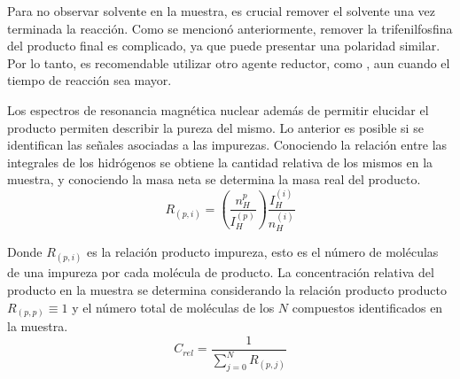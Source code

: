 \documentclass[fleqn,11pt]{SelfArx}
\begin{document}
Para no observar solvente en la muestra, es crucial remover el solvente una vez terminada la reacción. Como se mencionó anteriormente, remover la trifenilfosfina del producto final es complicado, ya que puede presentar una polaridad similar. Por lo tanto, es recomendable utilizar otro agente reductor, como , aun cuando el tiempo de reacción sea mayor.

Los espectros de resonancia magn\'etica nuclear adem\'as de permitir elucidar el producto permiten describir la pureza del mismo. Lo anterior es posible si se identifican las se\~nales asociadas a las impurezas. Conociendo la relaci\'on entre las integrales de los hidr\'ogenos se obtiene la cantidad relativa de los mismos en la muestra, y conociendo la masa neta se determina la masa real del producto.
\begin{equation}
R_{(p, i)} = \left(\dfrac{n_H^{p}}{I_H^{(p)}}\right)\dfrac{I^{(i)}_H}{n_H^{(i)}}
\end{equation}

Donde $R_{(p, i)}$ es la relaci\'on producto impureza, esto es el n\'umero de mol\'eculas de una impureza por cada mol\'ecula de producto. La concentraci\'on relativa del producto en la muestra se determina considerando la relaci\'on producto producto $R_{(p, p)} \equiv 1$ y el n\'umero total de mol\'eculas de los $N$ compuestos identificados en la muestra.
\begin{equation}\label{eq: concentracion}
C_{rel} = \dfrac{1}{\sum\limits_{j = 0}^{N} R_{(p, j)}}
\end{equation}
\end{document}
